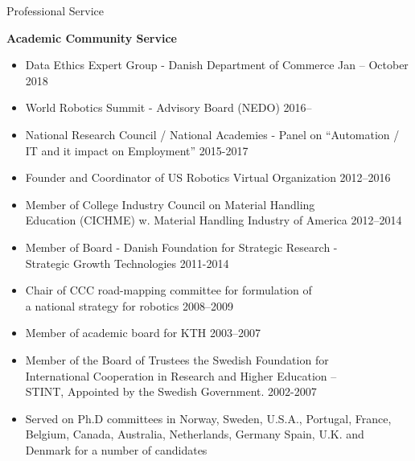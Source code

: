 \documentclass{article}
\begin{document}
\begin{cv}


\begin{cvlist}{Professional Service}%
\item {\bf Academic Community Service}
  \begin{itemize}
  \item Data Ethics Expert Group - Danish Department of Commerce \cftdotfill{\cftdotsep}
    Jan -- October 2018
  \item World Robotics Summit - Advisory Board (NEDO)
    \cftdotfill{\cftdotsep} 2016--
  \item National Research Council / National Academies - Panel on
    ``Automation / IT and it impact on Employment''
    \cftdotfill{\cftdotsep} 2015-2017
  \item Founder and Coordinator of US Robotics Virtual Organization
    \cftdotfill{\cftdotsep} 2012--2016
  \item Member of College Industry Council on Material Handling\\
    Education (CICHME) w. Material Handling Industry of America
    \cftdotfill{\cftdotsep} 2012--2014
  \item Member of Board - Danish Foundation for Strategic Research -\\
    Strategic Growth Technologies \cftdotfill{\cftdotsep} 2011-2014
  \item Chair of CCC road-mapping committee for formulation of \\
    a national strategy for robotics \cftdotfill{\cftdotsep}
    2008--2009
  \item Member of academic board for KTH \cftdotfill{\cftdotsep}
    2003--2007
  \item Member of the Board of Trustees the Swedish Foundation for\\
    International Cooperation in Research and Higher Education --\\
    STINT, Appointed by the Swedish Government.
    \cftdotfill{\cftdotsep} 2002-2007
  \item Served on Ph.D committees in Norway, Sweden, U.S.A., Portugal,
    France, Belgium, Canada, Australia, Netherlands, Germany Spain,
    U.K. and Denmark for a number of candidates
  \end{itemize}


\end{cvlist}
\end{cv}
\end{document}
